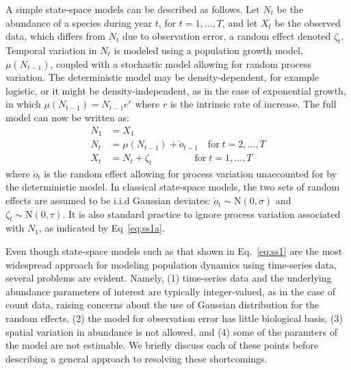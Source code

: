 \documentclass[12pt]{article}
\begin{document}
A simple state-space models can be described as follows.
Let $N_t$ be the abundance of a species during year $t$, for
$t=1,\hdots,T$, and let $X_t$ be
the observed data, which differs from $N_t$ due to observation error,
a random effect denoted $\zeta_t$. Temporal variation in $N_t$ is
modeled using a population growth model, $\mu(N_{t-1})$,
coupled with a stochastic model allowing
for random process variation. %
The deterministic model may be density-dependent, for example
logistic, or it might be density-independent, as in the case of
exponential growth, in which $\mu(N_{t-1}) = N_{t-1}e^{r}$ where $r$
is the intrinsic rate of increase. The full model can now be written
as:
\begin{subequations}
  \label{eq:ss1}
  \begin{align}
    N_1 &= X_1 \label{eq:ss1a} \\
    N_t &= \mu(N_{t-1}) + \grave{o}_{t-1} \quad \text{for} \; t=2,\hdots,T \label{eq:ss1b} \\
    X_t &= N_t + \zeta_t \qquad \qquad \;\, \text{for} \; t=1,\hdots,T \label{eq:ss1c}
  \end{align}
\end{subequations}
where $\grave{o}_t$ is the random effect allowing for process
variation unaccounted for by the deterministic model. In classical
state-space models, the two sets of random effects
are assumed to be i.i.d Gaussian deviates:
$\grave{o}_t \sim \mathrm{N}(0, \sigma)$ and
$\zeta_t \sim \mathrm{N}(0, \tau)$. It is also standard practice to
ignore process variation associated with $N_1$, as
indicated by Eq~\ref{eq:ss1a}.

Even though state-space models such as that shown in Eq.~\ref{eq:ss1}
are the most widespread approach for modeling population dynamics
using time-series data, several problems are evident. Namely, (1)
time-series data and the underlying abundance parameters of interest
are typically integer-valued, as in the case of count data, raising
concerns about the use of Gaussian distribution for the random
effects, (2) the model for observation error has little biological basis, (3)
spatial variation in abundance is not allowed, and (4) some of the
paramters of the model are not estimable. We briefly discuss each of
these points before describing a general approach to resolving these
shortcomings.
\end{document}
